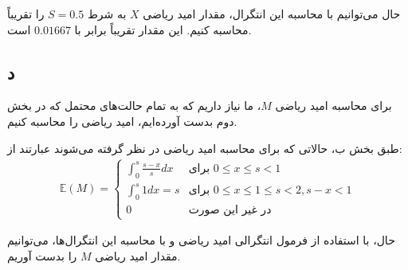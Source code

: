 حال می‌توانیم با محاسبه این انتگرال، مقدار امید ریاضی $X$ به شرط $S = 0.5$ را تقریباً محاسبه کنیم. این مقدار تقریباً برابر با $0.01667$ است.

\subsection*{د}

برای محاسبه امید ریاضی $M$، ما نیاز داریم که به تمام حالت‌های محتمل که در بخش دوم بدست آورده‌ایم، امید ریاضی را محاسبه کنیم.

طبق بخش ب، حالاتی که برای محاسبه امید ریاضی در نظر گرفته می‌شوند عبارتند از:
\begin{gather*}
	\mathbb{E}(M) =
	\begin{cases}
		\int_{0}^{s} \frac{s - x}{s} dx & \text{برای } 0 \le x \le s < 1\\
		\int_{0}^{s} 1 dx = s & \text{برای } 0 \le x \le 1 \le s < 2, s - x < 1\\
		0 & \text{در غیر این صورت}\
	\end{cases}
\end{gather*}

حال، با استفاده از فرمول انتگرالی امید ریاضی و با محاسبه این انتگرال‌ها، می‌توانیم مقدار امید ریاضی $M$ را بدست آوریم.	